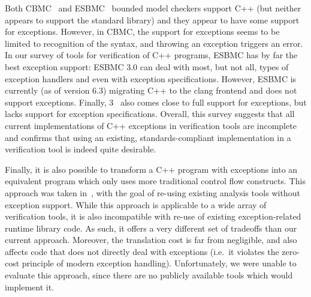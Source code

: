 Both CBMC~ and
ESBMC~ bounded model checkers support C++
(but neither appears to support the standard library) and they appear to have some
support for exceptions.
However, in CBMC, the support for exceptions seems to be limited to recognition
of the  syntax, and throwing an exception triggers an error.
In our survey of tools for verification of C++ programs, ESBMC
has by far the best exception support: ESBMC 3.0 can deal with most, but not
all, types of exception handlers and even with exception
specifications.
However, ESBMC is currently (as of version 6.3) migrating C++ to the clang frontend and does not support exceptions.
Finally, \divine{} 3~ also comes close to
full support for exceptions, but lacks support for exception
specifications. Overall, this survey suggests that all current
implementations of C++ exceptions in verification tools are incomplete
and confirms that using an existing, standards-compliant implementation
in a verification tool is indeed quite desirable.

Finally, it is also possible to transform a C++ program with exceptions
into an equivalent program which only uses more traditional control flow
constructs. This approach was taken in~,
with the goal of re-using existing analysis tools without exception
support. While this approach is applicable to a wide array of
verification tools, it is also incompatible with re-use of existing
exception-related runtime library code. As such, it offers a very
different set of tradeoffs than our current approach. Moreover, the
translation cost is far from negligible, and also affects code that does
not directly deal with exceptions (i.e.~it violates the zero-cost
principle of modern exception handling). Unfortunately, we were unable
to evaluate this approach, since there are no publicly available tools
which would implement it.

